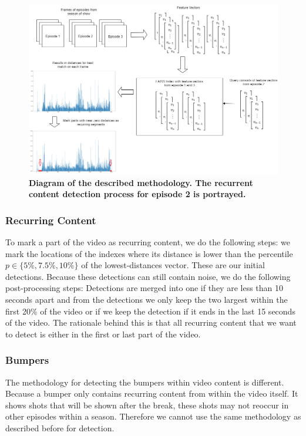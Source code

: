\documentclass{article}
\begin{document}
\begin{figure}[H]
	\includegraphics[width=\paperwidth, center, scale=0.7]{images/thesisdiagram.png}
	\centering
	\caption{\textbf{Diagram of the described methodology. The recurrent content detection process for episode 2 is portrayed.}}
	\label{fig:diagram}
\end{figure}

\subsubsection{Recurring Content}
To mark a part of the video as recurring content, we do the following steps: we mark the locations of the indexes where its distance is lower than the percentile $p \in \{5\%, 7.5\%, 10\%\}$ of the lowest-distances vector. These are our initial detections. Because these detections can still contain noise, we do the following post-processing steps: Detections are merged into one if they are less than 10 seconds apart and from the detections we only keep the two largest within the first 20\% of the video or if we keep the detection if it ends in the last 15 seconds of the video. The rationale behind this is that all recurring content that we want to detect is either in the first or last part of the video.

\subsubsection{Bumpers}
The methodology for detecting the bumpers within video content is different. Because a bumper only contains recurring content from within the video itself. It shows shots that will be shown after the break, these shots may not reoccur in other episodes within a season. Therefore we cannot use the same methodology as described before for detection.
\end{document}
